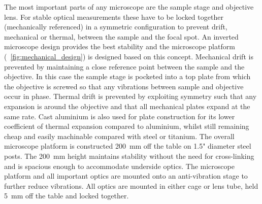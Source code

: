 \documentclass{article}
\begin{document}
The most important parts of any microscope are the sample stage and objective lens. For stable optical measurements these have to be locked together {\color{red}(mechanically referenced)} in a symmetric configuration to prevent drift, mechanical or thermal, between the sample and the focal spot. An inverted microscope design provides the best stability and the microscope platform (\figurename~\ref{fig:mechanical_design}) is designed based on this concept.
Mechanical drift is prevented by maintaining a close reference point between the sample and the objective. In this case the sample stage is pocketed into a top plate from which the objective is screwed so that any vibrations between sample and objective occur in phase.
Thermal drift is prevented by exploiting symmetry such that any expansion is around the objective and that all mechanical plates expand at the same rate. Cast aluminium is also used for plate construction for its lower coefficient of thermal expansion compared to aluminium, whilst still remaining cheap and easily machinable compared with steel or titanium.
The overall microscope platform is constructed \SI{200}{mm} off the table on 1.5" diameter steel posts. The \SI{200}{mm} height maintains stability without the need for cross-linking and is spacious enough to accommodate underside optics. The microscope platform and all important optics are mounted onto an anti-vibration stage to further reduce vibrations. All optics are mounted in either cage or lens tube, held \SI{5}{mm} off the table and locked together.
\end{document}

